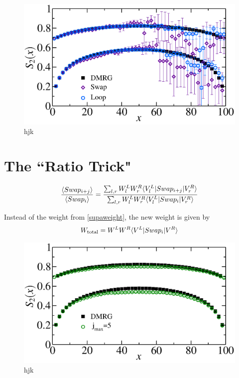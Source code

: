 \begin{figure} {
	\includegraphics[width=6in]{./figures/paper2/fig_1D/loopfig.pdf} 
	\centering
	\caption[Renyi for 100 site chain]{ 
	\label{loopfig}
		hjk	
	}
}\end{figure}


	

\section{The ``Ratio Trick"}

\begin{equation}
\frac{\langle Swap_{i+j}\rangle}{\langle Swap_{i}\rangle} = 
\frac{ \sum_{l,r} W^L_l W^R_r \langle {V^L_l} \rvert Swap_{i+j} \lvert {V^R_r} \rangle}
							{\sum_{l,r} W^L_l W_r^R \langle {V^L_l} \rvert Swap_i \lvert { V^R_r} \rangle}
\end{equation}

Instead of the weight from \eqref{supaweight}, the new weight is given by
\begin{equation}
W_{\rm total} = W^LW^R\langle {V^L} \rvert Swap_i \lvert {V^R} \rangle
\end{equation}


\begin{figure} {
	\includegraphics[width=6in]{./figures/paper2/fig_1D/ratiofig.pdf} 
	\centering
	\caption[Renyi for 100 site chain]{ 
	\label{ratiofig}
		hjk	
	}
}\end{figure}


